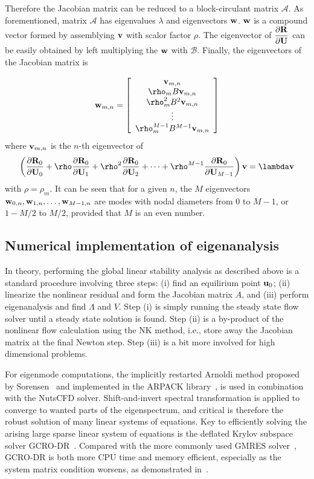 \documentclass[journal,final]{new-aiaa}
\begin{document}
Therefore the Jacobian matrix can be reduced to a block-circulant
matrix $\mathcal{A}$.
As forementioned, matrix $\mathcal{A}$ has eigenvalues $\lambda$
and eigenvectors $\mathbf{w}$. $\mathbf{w}$ is a compound vector formed by assemblying
$\mathbf{v}$ with scalor factor $\rho$. The eigenvector of $\dfrac{\partial\mathbf{R}}{\partial\mathbf{U}}$ can be
easily obtained by left multiplying the $\mathbf{w}$ with $\mathcal{B}$.
Finally, the eigenvectors of the Jacobian matrix is

\begin{equation*}
\w_{m,n}=
\left[
\begin{array}{c}
\vv_{m,n} \\
\rho_m B \vv_{m,n} \\
\rho_m^2  B^2\vv_{m,n} \\
\vdots \\
\rho_m^{M-1} B^{M-1}\vv_{m,n}
\end{array}
\right]
\end{equation*}
where $\mathbf{v}_{m,n}$ is the $n$-th eigenvector of 
\begin{equation*}
\left(
\df{\R_0}{\U_0}+ \rho \df{\R_0}{\U_1}+ \rho^2\df{\R_0}{\U_2}  + \cdots + \rho^{M-1} \df{\R_0}{\U_{M-1}}
\right )
 \vv =  \lambda \vv
\end{equation*}
with $\rho=\rho_m$.
{\color{red} It can be seen that for a given $n$, the $M$ eigenvectors $\mathbf{w}_{0,n},\mathbf{w}_{1,n},\dots,\mathbf{w}_{M-1,n}$
are modes with nodal diameters from $0$ to $M-1$, or $1-M/2$ to $M/2$,
provided that $M$ is an even number.}



\subsection{Numerical implementation of eigenanalysis}
In theory, performing the global linear stability analysis as described above
is a standard procedure involving three steps: (i) find an equilirium point $\mathbf{u}_0$;
(ii) linearize the nonlinear residual and form the Jacobian matrix $A$, and
(iii) perform eigenanalysis and find $\Lambda$ and $V$. Step (i) is simply
running the steady state flow solver until a steady state solution
is found. Step (ii) is a by-product of the nonlinear flow calculation using
the NK method, i.e., store away the Jacobian matrix at the final Newton step.
Step (iii) is a bit more involved for high dimensional problems.

For eigenmode computations, the implicitly restarted Arnoldi method proposed
by Sorensen~\cite{sorensen1992implicit} and implemented in the ARPACK
library~\cite{lehoucq1998arpack}, is used
in combination with the NutsCFD solver.
Shift-and-invert spectral transformation is applied to converge to wanted parts
of the eigenspectrum, and critical is therefore the robust solution of many linear
systems of equations. 
Key to efficiently solving the arising large sparse linear system of equations
is the deflated Krylov subspace solver GCRO-DR~\cite{parks2006recycling}.
Compared with the more commonly used GMRES solver~\cite{saad1986gmres},
GCRO-DR is both more CPU time and memory efficient, especially as the system
matrix condition worsens, as demonstrated in~\cite{xu2016enabling,xu2017robust}.
\end{document}
